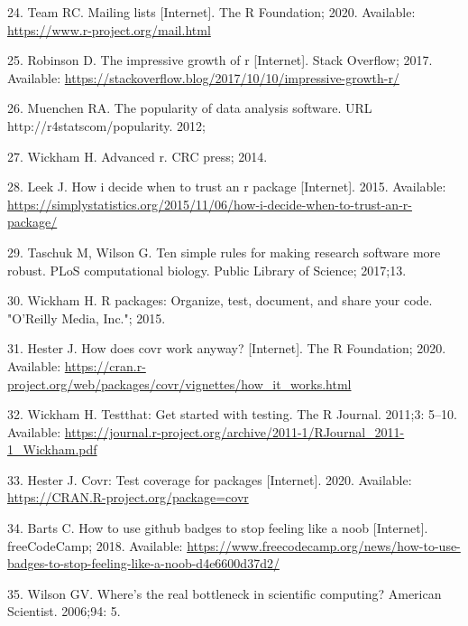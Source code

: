 \documentclass[10pt,letterpaper]{article}
\begin{document}
\leavevmode\hypertarget{ref-Rmail2020}{}%
24. Team RC. Mailing lists {[}Internet{]}. The R Foundation; 2020.
Available: \url{https://www.r-project.org/mail.html}

\leavevmode\hypertarget{ref-robinson2017}{}%
25. Robinson D. The impressive growth of r {[}Internet{]}. Stack
Overflow; 2017. Available:
\url{https://stackoverflow.blog/2017/10/10/impressive-growth-r/}

\leavevmode\hypertarget{ref-muenchen2012}{}%
26. Muenchen RA. The popularity of data analysis software. URL
http://r4statscom/popularity. 2012;

\leavevmode\hypertarget{ref-wickham2014}{}%
27. Wickham H. Advanced r. CRC press; 2014.

\leavevmode\hypertarget{ref-leek2015}{}%
28. Leek J. How i decide when to trust an r package {[}Internet{]}.
2015. Available:
\url{https://simplystatistics.org/2015/11/06/how-i-decide-when-to-trust-an-r-package/}

\leavevmode\hypertarget{ref-taschuk2017}{}%
29. Taschuk M, Wilson G. Ten simple rules for making research software
more robust. PLoS computational biology. Public Library of Science;
2017;13.

\leavevmode\hypertarget{ref-wickham2015}{}%
30. Wickham H. R packages: Organize, test, document, and share your
code. "O'Reilly Media, Inc."; 2015.

\leavevmode\hypertarget{ref-hester2020}{}%
31. Hester J. How does covr work anyway? {[}Internet{]}. The R
Foundation; 2020. Available:
\url{https://cran.r-project.org/web/packages/covr/vignettes/how_it_works.html}

\leavevmode\hypertarget{ref-wickham2011}{}%
32. Wickham H. Testthat: Get started with testing. The R Journal.
2011;3: 5--10. Available:
\url{https://journal.r-project.org/archive/2011-1/RJournal_2011-1_Wickham.pdf}

\leavevmode\hypertarget{ref-covr}{}%
33. Hester J. Covr: Test coverage for packages {[}Internet{]}. 2020.
Available: \url{https://CRAN.R-project.org/package=covr}

\leavevmode\hypertarget{ref-barts2018}{}%
34. Barts C. How to use github badges to stop feeling like a noob
{[}Internet{]}. freeCodeCamp; 2018. Available:
\url{https://www.freecodecamp.org/news/how-to-use-badges-to-stop-feeling-like-a-noob-d4e6600d37d2/}

\leavevmode\hypertarget{ref-wilson2006}{}%
35. Wilson GV. Where's the real bottleneck in scientific computing?
American Scientist. 2006;94: 5.
\end{document}
